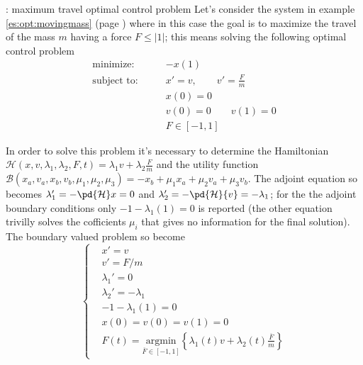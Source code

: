 	\begin{example}{: maximum travel optimal control problem}
		Let's consider the system in example \ref{es:opt:movingmass} (page \pageref{es:opt:movingmass}) where in this case the goal is to maximize the travel of the mass $m$ having a force $F \leq |1|$; this means solving the following optimal control problem
		\begin{align*}
			\textrm{minimize:} \qquad & -x(1) \\
			\textrm{subject to:} \qquad & x' = v, \qquad v' = \frac F m \\
			& x(0) = 0  \\ & v(0) = 0 \qquad v(1) = 0 \\
			& F \in [-1,1]
		\end{align*}
		
		In order to solve this problem it's necessary to determine the Hamiltonian $\mathcal H(x,v,\lambda_1,\lambda_2, F,t) = \lambda_1 v + \lambda_2 \frac F m$ and the  utility function $\mathcal B(x_a,v_a,x_b,v_b,\mu_1,\mu_2,\mu_3) = -x_b + \mu_1 x_a + \mu_2 v_a + \mu_3 v_b$. The adjoint equation so becomes $\lambda_1' = - \pd{\mathcal H}x = 0$ and $\lambda_2' = - \pd{\mathcal H}{v} = - \lambda_1$; for the the adjoint boundary conditions only $-1 - \lambda_1(1)=0$ is reported (the other equation trivilly solves the cofficients $\mu_i$ that gives no information for the final solution). The boundary valued problem so become
		\[ \left\{ \begin{aligned}
			& x' = v \\ & v' = F/m \\ & \lambda_1' = 0 \\ & \lambda_2' = - \lambda_1 \\
			& -1-\lambda_1(1)= 0\\
			& x(0) = v(0) = v(1) = 0 \\
			& F(t) = \underset{\overline F \in [-1,1]}{\textrm{argmin}} \left\{ \lambda_1(t) v + \lambda_2(t) \frac {\overline F}m \right\}
		\end{aligned} \right.  \]
		

\end{example}

